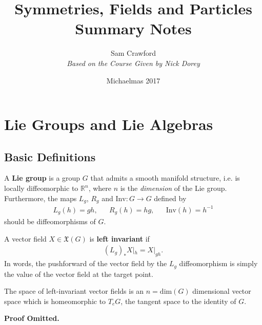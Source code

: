 \documentclass[11pt,fleqn]{article}
\renewenvironment{prop}{\begin{pBox}\begin{propT}}{\end{propT}\end{pBox}}
\begin{document}
\title{Symmetries, Fields and Particles\\
\Large{Summary Notes} \\ \hrulefill}
\author{Sam Crawford\\
\large{\textsl{Based on the Course Given by Nick Dorey}}}
\date{Michaelmas 2017}

\maketitle
\begin{center}

\end{center}

\tableofcontents

\pagebreak

\section{Lie Groups and Lie Algebras}

\subsection{Basic Definitions}

\begin{definition}
	A \textbf{Lie group} is a group $G$ that admits a smooth manifold structure, i.e. is locally diffeomorphic to $\mathbb{R}^n$, where $n$ is the \textit{dimension} of the Lie group. Furthermore, the maps $L_g$, $R_g$ and $ \text{Inv} : G \to G$ defined by
		\begin{align}
			L_g (h) = gh, && R_g (h) = hg, && \text{Inv}(h) = h^{-1}
		\end{align}
	should be diffeomorphisms of $G$.
\end{definition}

\begin{definition}
	A vector field $X \in \mathfrak{X}(G)$ is \textbf{left invariant} if
		\begin{align}
			 (L_g)_* X|_h = X|_{gh}.
		\end{align}
	In words, the pushforward of the vector field by the $L_g$ diffeomorphism is simply the value of the vector field at the target point.
\end{definition}

\begin{prop}
	The space of left-invariant vector fields is an $n=\text{dim}(G)$ dimensional vector space which is homeomorphic to $T_eG$, the tangent space to the identity of $G$.
\end{prop}
\textbf{Proof Omitted.}
\end{document}
